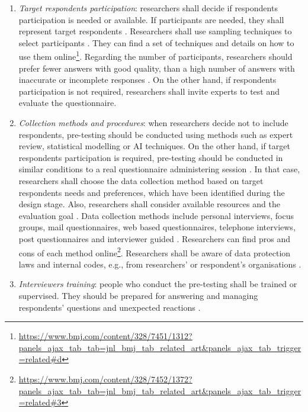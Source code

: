 \begin{enumerate}
    \item \emph{Target respondents participation}: researchers shall decide if respondents participation is needed or available. If participants are needed, they shall represent target respondents \cite{Krosnick2009,Boynton2004}.
    Researchers shall use sampling techniques to select participants \cite{Boynton2004c,Diem,Radhakrishna2007}. They can find a set of techniques and details on how to use them online\footnote{\url{https://www.bmj.com/content/328/7451/1312?panels_ajax_tab_tab=jnl_bmj_tab_related_art&panels_ajax_tab_trigger=related\#d}}.
    Regarding the number of participants, researchers should prefer fewer answers with good quality, than a high number of answers with inaccurate or incomplete responses \cite{Boynton2004}. On the other hand, if respondents participation is not required, researchers shall invite experts to test and evaluate the questionnaire.
    
    \item \emph{Collection methods and procedures}: when researchers decide not to include respondents, pre-testing should be conducted using methods such as expert review, statistical modelling or \ac{AI} techniques. On the other hand, if target respondents participation is required, pre-testing should be conducted in similar conditions to a real questionnaire administering session \cite{Krosnick2009}. In that case, researchers shall choose the data collection method based on target respondents needs and preferences, which have been identified during the design stage. Also, researchers shall consider available resources and the evaluation goal \cite{Boynton2004}.
    Data collection methods include personal interviews, focus groups, mail questionnaires, web based questionnaires, telephone interviews, post questionnaires and interviewer guided \cite{Crawford1997,Diem,Boynton2004}. Researchers can find pros and cons of each method online\footnote{\url{https://www.bmj.com/content/328/7452/1372?panels_ajax_tab_tab=jnl_bmj_tab_related_art&panels_ajax_tab_trigger=related\#3}}.
    Researchers shall be aware of data protection laws and internal codes, e.g., from researchers' or respondent's organisations \cite{Boynton2004}.
    
    \item \emph{Interviewers training}: people who conduct the pre-testing shall be trained or supervised. They should be prepared for answering and managing respondents' questions and unexpected reactions \cite{Boynton2004b}.
\end{enumerate}

